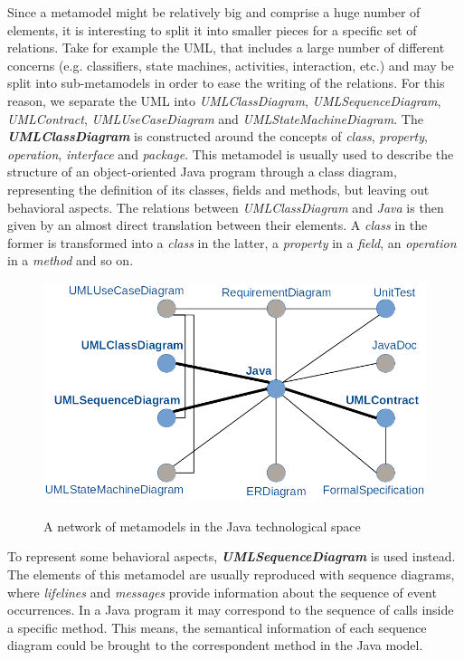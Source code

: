 \documentclass[tuberlin,cic,tc,english,noabntcite, oneside]{iiufrgs}
\begin{document}
Since a metamodel might be relatively big and comprise a huge number of elements, it is interesting to split it into smaller pieces for a specific set of relations. Take for example the UML, that includes a large number of different concerns (e.g. classifiers, state machines, activities, interaction, etc.) and may be split into sub-metamodels in order to ease the writing of the relations. For this reason, we separate the UML into \emph{UMLClassDiagram}, \emph{UMLSequenceDiagram}, \emph{UMLContract}, \emph{UMLUseCaseDiagram} and \emph{UMLStateMachineDiagram}. The \textbf{\emph{UMLClassDiagram}} is constructed around the concepts of \emph{class}, \emph{property}, \emph{operation}, \emph{interface} and \emph{package}. This metamodel is usually used to describe the structure of an object-oriented Java program through a class diagram, representing the definition of its classes, fields and methods, but leaving out behavioral aspects. The relations between \emph{UMLClassDiagram} and \emph{Java} is then given by an almost direct translation between their elements. A \emph{class} in the former is transformed into a \emph{class} in the latter, a \emph{property} in a \emph{field}, an \emph{operation} in a \emph{method} and so on.

\begin{figure}[H]
	\centering
    \caption{A network of metamodels in the Java technological space}
    \includegraphics[width=.7\textwidth]{network_metamodels}
    \label{fig:network_metamodels}
\end{figure}

To represent some behavioral aspects, \textbf{\emph{UMLSequenceDiagram}} is used instead. The elements of this metamodel are usually reproduced with sequence diagrams, where \emph{lifelines} and \emph{messages} provide information about the sequence of event occurrences. In a Java program it may correspond to the sequence of calls inside a specific method. This means, the semantical information of each sequence diagram could be brought to the correspondent method in the Java model.
\end{document}
